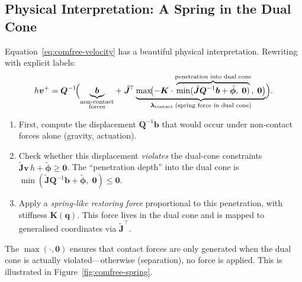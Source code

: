 \documentclass[11pt,twoside]{report}
\theoremstyle{definition}
\theoremstyle{plain}
\theoremstyle{remark}
\newcommand{\q}{\bm{q}}
\newcommand{\0}{\bm{0}}
\newcommand{\J}{\bm{J}}
\begin{document}
\subsection{Physical Interpretation: A Spring in the Dual Cone}
\label{sec:comfree-spring}

Equation~\eqref{eq:comfree-velocity} has a beautiful physical interpretation.
Rewriting with explicit labels:
\begin{equation}\label{eq:comfree-spring}
h\bm{v}^{+}=\bm{Q}^{-1}\!\Bigl(
\underbrace{\bm{b}}_{\substack{\text{non-contact}\\\text{forces}}}
+\;\tilde{\J}^{\!\top}\underbrace{\max\!\bigl(-\bm{K}\cdot
\overbrace{\min(\tilde{\J}\bm{Q}^{-1}\bm{b}+\tilde{\bm{\phi}},\;\0)}^{
\text{penetration into dual cone}},\;\0\bigr)}_{\bm{\lambda}_{\text{contact}}\;\text{(spring force in dual cone)}}
\Bigr).
\end{equation}

\begin{insightbox}
\begin{enumerate}
\item First, compute the displacement $\bm{Q}^{-1}\bm{b}$ that would occur
      under non-contact forces alone (gravity, actuation).
\item Check whether this displacement \emph{violates} the dual-cone constraints
      $\tilde{\J}\bm{v}\,h+\tilde{\bm{\phi}}\ge\0$.
      The ``penetration depth'' into the dual cone is
      $\min(\tilde{\J}\bm{Q}^{-1}\bm{b}+\tilde{\bm{\phi}},\;\0)\le\0$.
\item Apply a \emph{spring-like restoring force} proportional to this penetration,
      with stiffness $\bm{K}(\q)$.  This force lives in the dual cone and is
      mapped to generalised coordinates via $\tilde{\J}^{\!\top}$.
\end{enumerate}
The $\max(\cdot,\0)$ ensures that contact forces are only generated when
the dual cone is actually violated---otherwise (separation), no force is applied.
This is illustrated in Figure~\ref{fig:comfree-spring}.
\end{insightbox}
\end{document}
